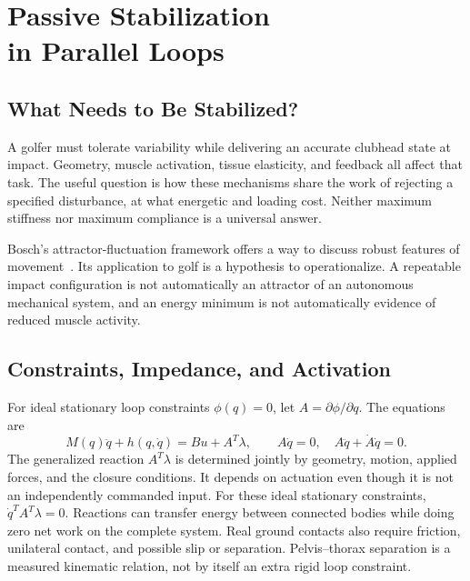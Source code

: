 \chapter[Passive Stabilization in Parallel Loops]{Passive Stabilization\\in Parallel Loops}
\label{ch:passive_stabilization}

\section{What Needs to Be Stabilized?}

A golfer must tolerate variability while delivering an accurate clubhead state
at impact. Geometry, muscle activation, tissue elasticity, and feedback all
affect that task. The useful question is how these mechanisms share the work
of rejecting a specified disturbance, at what energetic and loading cost.
Neither maximum stiffness nor maximum compliance is a universal answer.

Bosch's attractor-fluctuation framework offers a way to discuss robust features
of movement~\cite{bosch2020agility}. Its application to golf is a hypothesis
to operationalize. A repeatable impact configuration is not automatically an
attractor of an autonomous mechanical system, and an energy minimum is not
automatically evidence of reduced muscle activity.

\section{Constraints, Impedance, and Activation}
\label{sec:stabilization_problem}

For ideal stationary loop constraints $\phi(q)=0$, let $A=\partial\phi/\partial q$.
The equations are
\begin{equation}
M(q)\ddot q+h(q,\dot q)=Bu+A^T\lambda,\qquad
A\dot q=0,\quad A\ddot q+\dot A\dot q=0.
\label{eq:constrained_eom}
\end{equation}
The generalized reaction $A^T\lambda$ is determined jointly by geometry,
motion, applied forces, and the closure conditions. It depends on actuation
even though it is not an independently commanded input. For these ideal
stationary constraints, $\dot q^TA^T\lambda=0$. Reactions can transfer energy
between connected bodies while doing zero net work on the complete system.
Real ground contacts also require friction, unilateral contact, and possible
slip or separation. Pelvis--thorax separation is a measured kinematic relation,
not by itself an extra rigid loop constraint.

